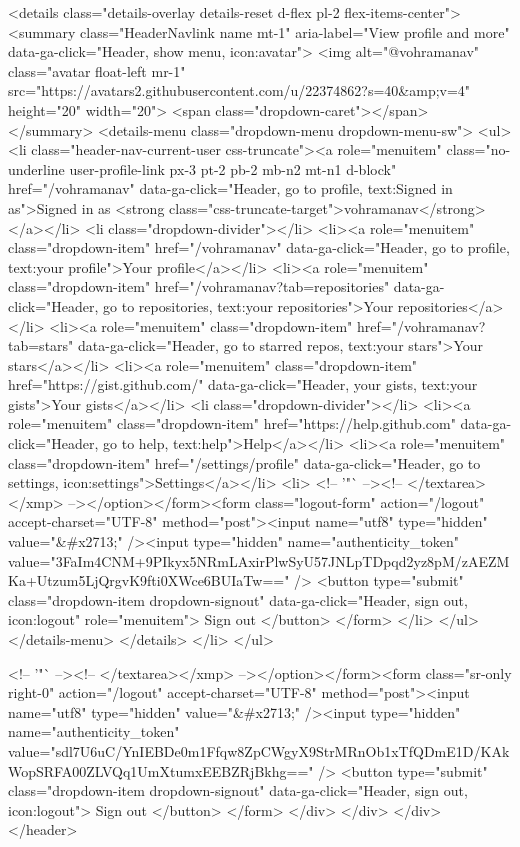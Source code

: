     <details class="details-overlay details-reset d-flex pl-2 flex-items-center">
      <summary class="HeaderNavlink name mt-1"
        aria-label="View profile and more"
        data-ga-click="Header, show menu, icon:avatar">
        <img alt="@vohramanav" class="avatar float-left mr-1" src="https://avatars2.githubusercontent.com/u/22374862?s=40&amp;v=4" height="20" width="20">
        <span class="dropdown-caret"></span>
      </summary>
      <details-menu class="dropdown-menu dropdown-menu-sw">
        <ul>
          <li class="header-nav-current-user css-truncate"><a role="menuitem" class="no-underline user-profile-link px-3 pt-2 pb-2 mb-n2 mt-n1 d-block" href="/vohramanav" data-ga-click="Header, go to profile, text:Signed in as">Signed in as <strong class="css-truncate-target">vohramanav</strong></a></li>
          <li class="dropdown-divider"></li>
          <li><a role="menuitem" class="dropdown-item" href="/vohramanav" data-ga-click="Header, go to profile, text:your profile">Your profile</a></li>
          <li><a role="menuitem" class="dropdown-item" href="/vohramanav?tab=repositories" data-ga-click="Header, go to repositories, text:your repositories">Your repositories</a></li>
          <li><a role="menuitem" class="dropdown-item" href="/vohramanav?tab=stars" data-ga-click="Header, go to starred repos, text:your stars">Your stars</a></li>
            <li><a role="menuitem" class="dropdown-item" href="https://gist.github.com/" data-ga-click="Header, your gists, text:your gists">Your gists</a></li>
          <li class="dropdown-divider"></li>
          <li><a role="menuitem" class="dropdown-item" href="https://help.github.com" data-ga-click="Header, go to help, text:help">Help</a></li>
          <li><a role="menuitem" class="dropdown-item" href="/settings/profile" data-ga-click="Header, go to settings, icon:settings">Settings</a></li>
          <li>
            <!-- '"` --><!-- </textarea></xmp> --></option></form><form class="logout-form" action="/logout" accept-charset="UTF-8" method="post"><input name="utf8" type="hidden" value="&#x2713;" /><input type="hidden" name="authenticity_token" value="3FaIm4CNM+9PIkyx5NRmLAxirPlwSyU57JNLpTDpqd2yz8pM/zAEZMKa+Utzum5LjQrgvK9fti0XWce6BUIaTw==" />
              <button type="submit" class="dropdown-item dropdown-signout" data-ga-click="Header, sign out, icon:logout" role="menuitem">
                Sign out
              </button>
</form>          </li>
        </ul>
      </details-menu>
    </details>
  </li>
</ul>



        <!-- '"` --><!-- </textarea></xmp> --></option></form><form class="sr-only right-0" action="/logout" accept-charset="UTF-8" method="post"><input name="utf8" type="hidden" value="&#x2713;" /><input type="hidden" name="authenticity_token" value="sdl7U6uC/YnIEBDe0m1Ffqw8ZpCWgyX9StrMRnOb1xTfQDmE1D/KAkWopSRFA00ZLVQq1UmXtumxEEBZRjBkhg==" />
          <button type="submit" class="dropdown-item dropdown-signout" data-ga-click="Header, sign out, icon:logout">
            Sign out
          </button>
</form>      </div>
    </div>
  </div>
</header>

